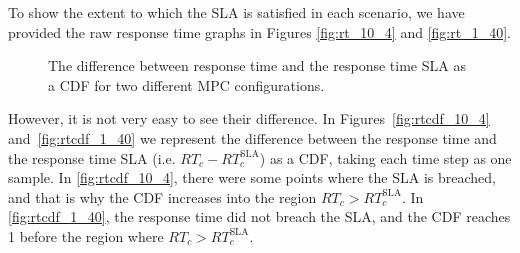 To show the extent to which the SLA is satisfied in each scenario, we have provided the raw response time graphs in Figures \ref{fig:rt_10_4} and \ref{fig:rt_1_40}.
\begin{figure}
		\caption{The difference between response time and the response time SLA as a CDF for two different MPC configurations.}
	\label{fig:case_study_one_response_time_cdf}
\end{figure}
 However, it is not very easy to see their difference. In Figures~\ref{fig:rtcdf_10_4} and~\ref{fig:rtcdf_1_40} we represent the difference between the response time and the response time SLA (i.e. $RT_c - RT_c^\text{SLA}$) as a CDF, taking each time step as one sample. 
 In \ref{fig:rtcdf_10_4}, there were some points where the SLA is breached, and that is why the CDF increases into the region $RT_{c}>RT^\text{SLA}_c$. In \ref{fig:rtcdf_1_40}, the response time did not breach the SLA, and the CDF reaches 1 before the region where $RT_{c}>RT^\text{SLA}_c$. 

